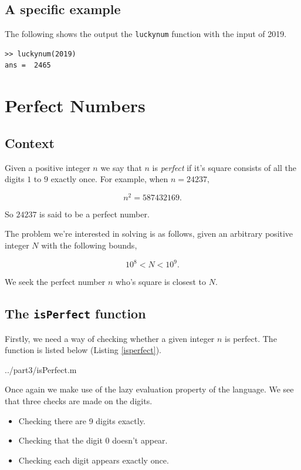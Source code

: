 \documentclass[10pt]{article}
\begin{document}
\subsection{A specific example}

The following shows the output the \texttt{luckynum} function with the input of 2019.

\begin{verbatim}
>> luckynum(2019)
ans =  2465
\end{verbatim}

\section{Perfect Numbers}

\subsection{Context}
Given a positive integer $n$ we say that $n$ is \emph{perfect} if it's square consists of all the digits $1$ to $9$ exactly once. For example, when $ n = 24237, $

$$ n^2 = 587432169 .$$

\noindent So $24237$ is said to be a perfect number.

The problem we're interested in solving is as follows, given an arbitrary positive integer $N$ with the following bounds,

\begin{equation} \label{rangeN}
10^8 < N < 10^{9}.
\end{equation}


\noindent We seek the perfect number $n$ who's square is closest to $N$.

\subsection{The \texttt{isPerfect} function}

Firstly, we need a way of checking whether a given integer $n$ is perfect. The function is listed below (Listing \ref{isperfect}).

  {../part3/isPerfect.m}
 
Once again we make use of the lazy evaluation property of the language. We see that three checks are made on the digits.
 
 \begin{itemize}
 \item Checking there are 9 digits exactly.
 \item Checking that the digit $0$ doesn't appear.
 \item Checking each digit appears exactly once.
 \end{itemize}
 
\end{document}
